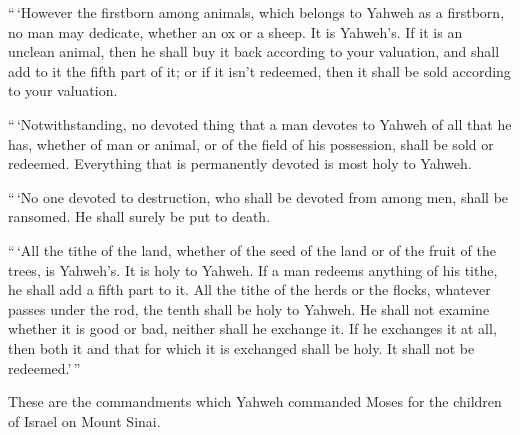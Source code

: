  ``\,`However the firstborn among animals, which belongs to
Yahweh as a firstborn, no man may dedicate, whether an ox or a sheep. It
is Yahweh's.  If it is an unclean animal, then he shall buy
it back according to your valuation, and shall add to it the fifth part
of it; or if it isn't redeemed, then it shall be sold according to your
valuation.

 ``\,`Notwithstanding, no devoted thing that a man devotes
to Yahweh of all that he has, whether of man or animal, or of the field
of his possession, shall be sold or redeemed. Everything that is
permanently devoted is most holy to Yahweh.

 ``\,`No one devoted to destruction, who shall be devoted
from among men, shall be ransomed. He shall surely be put to death.

 ``\,`All the tithe of the land, whether of the seed of the
land or of the fruit of the trees, is Yahweh's. It is holy to Yahweh.
 If a man redeems anything of his tithe, he shall add a
fifth part to it.  All the tithe of the herds or the
flocks, whatever passes under the rod, the tenth shall be holy to
Yahweh.  He shall not examine whether it is good or bad,
neither shall he exchange it. If he exchanges it at all, then both it
and that for which it is exchanged shall be holy. It shall not be
redeemed.'\,''

 These are the commandments which Yahweh commanded Moses
for the children of Israel on Mount Sinai.
